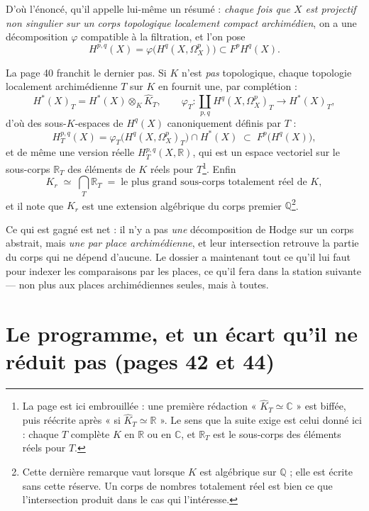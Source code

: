 \documentclass[11pt,a4paper]{article}
\begin{document}
D'où l'énoncé, qu'il appelle lui-même un résumé : \emph{chaque fois que $X$ est
projectif non singulier sur un corps topologique localement compact
archimédien}, on a une décomposition $\varphi$ compatible à la filtration, et
l'on pose
\[
  H^{p,q}(X) = \varphi\bigl(H^{q}(X, \Omega^{p}_{X})\bigr) \subset F^{p} H^{q}(X) .
\]

La page 40 franchit le dernier pas. Si $K$ n'est \emph{pas} topologique, chaque
topologie localement archimédienne $T$ sur $K$ en fournit une, par complétion :
\[
  H^{*}(X)_{T} = H^{*}(X) \otimes_{K} \widehat{K}_{T} ,
  \qquad
  \varphi_{T} \colon \coprod_{p,q} H^{q}(X, \Omega^{p}_{X})_{T}
  \longrightarrow H^{*}(X)_{T} ,
\]
d'où des sous-$K$-espaces de $H^{q}(X)$ canoniquement définis par $T$ :
\[
  H^{p,q}_{T}(X) = \varphi_{T}\bigl(H^{q}(X, \Omega^{p}_{X})_{T}\bigr) \cap H^{*}(X)
  \;\subset\; F^{p}\bigl(H^{q}(X)\bigr) ,
\]
et de même une version réelle $H^{p,q}_{T}(X, \mathbb{R})$, qui est un espace
vectoriel sur le sous-corps $\mathbb{R}_{T}$ des éléments de $K$ réels pour
$T$\footnote{La page est ici embrouillée : une première rédaction
« $\widehat{K}_{T} \simeq \mathbb{C}$ » est biffée, puis réécrite après « si
$\widehat{K}_{T} \simeq \mathbb{R}$ ». Le sens que la suite exige est celui
donné ici : chaque $T$ complète $K$ en $\mathbb{R}$ ou en $\mathbb{C}$, et
$\mathbb{R}_{T}$ est le sous-corps des éléments réels pour $T$.}. Enfin
\[
  K_{r} \;\simeq\; \bigcap_{T} \mathbb{R}_{T}
  \;=\; \text{le plus grand sous-corps totalement réel de } K ,
\]
et il note que $K_{r}$ est une extension algébrique du corps premier
$\mathbb{Q}$\footnote{Cette dernière remarque vaut lorsque $K$ est algébrique
sur $\mathbb{Q}$ ; elle est écrite sans cette réserve. Un corps de nombres
totalement réel est bien ce que l'intersection produit dans le cas qui
l'intéresse.}.

Ce qui est gagné est net : il n'y a pas \emph{une} décomposition de Hodge sur un
corps abstrait, mais \emph{une par place archimédienne}, et leur intersection
retrouve la partie du corps qui ne dépend d'aucune. Le dossier a maintenant tout
ce qu'il lui faut pour indexer les comparaisons par les places, ce qu'il fera
dans la station suivante — non plus aux places archimédiennes seules, mais à
toutes.

\section*{Le programme, et un écart qu'il ne réduit pas (pages 42 et 44)}
\end{document}
